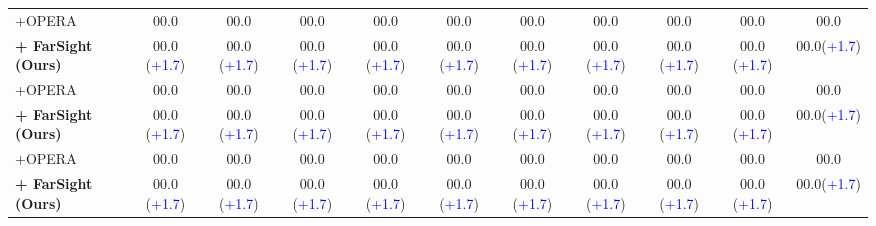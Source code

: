 {\begin{tabular}{l||ccc|cc|ccccc}
            \hdashline
            +OPERA    &00.0 &00.0 &00.0 &00.0 &00.0 &00.0 &00.0 &00.0 &00.0 &00.0\\
            \cellcolor{gray!20}\textbf{+ FarSight (Ours)}  &\cellcolor{gray!20}00.0 (\textcolor{blue}{+1.7}) &\cellcolor{gray!20}00.0 (\textcolor{blue}{+1.7})&\cellcolor{gray!20}00.0 (\textcolor{blue}{+1.7})&\cellcolor{gray!20}00.0 (\textcolor{blue}{+1.7})&\cellcolor{gray!20}00.0 (\textcolor{blue}{+1.7})&\cellcolor{gray!20}00.0 (\textcolor{blue}{+1.7})&\cellcolor{gray!20}00.0 (\textcolor{blue}{+1.7})&\cellcolor{gray!20}00.0 (\textcolor{blue}{+1.7})&\cellcolor{gray!20}00.0 (\textcolor{blue}{+1.7})&\cellcolor{gray!20}00.0(\textcolor{blue}{+1.7})\\
            \hdashline
            +OPERA    &00.0 &00.0 &00.0 &00.0 &00.0 &00.0 &00.0 &00.0 &00.0 &00.0\\
            \cellcolor{gray!20}\textbf{+ FarSight (Ours)}  &\cellcolor{gray!20}00.0 (\textcolor{blue}{+1.7}) &\cellcolor{gray!20}00.0 (\textcolor{blue}{+1.7})&\cellcolor{gray!20}00.0 (\textcolor{blue}{+1.7})&\cellcolor{gray!20}00.0 (\textcolor{blue}{+1.7})&\cellcolor{gray!20}00.0 (\textcolor{blue}{+1.7})&\cellcolor{gray!20}00.0 (\textcolor{blue}{+1.7})&\cellcolor{gray!20}00.0 (\textcolor{blue}{+1.7})&\cellcolor{gray!20}00.0 (\textcolor{blue}{+1.7})&\cellcolor{gray!20}00.0 (\textcolor{blue}{+1.7})&\cellcolor{gray!20}00.0(\textcolor{blue}{+1.7})\\
            \hdashline
            +OPERA    &00.0 &00.0 &00.0 &00.0 &00.0 &00.0 &00.0 &00.0 &00.0 &00.0\\
            \cellcolor{gray!20}\textbf{+ FarSight (Ours)}  &\cellcolor{gray!20}00.0 (\textcolor{blue}{+1.7}) &\cellcolor{gray!20}00.0 (\textcolor{blue}{+1.7})&\cellcolor{gray!20}00.0 (\textcolor{blue}{+1.7})&\cellcolor{gray!20}00.0 (\textcolor{blue}{+1.7})&\cellcolor{gray!20}00.0 (\textcolor{blue}{+1.7})&\cellcolor{gray!20}00.0 (\textcolor{blue}{+1.7})&\cellcolor{gray!20}00.0 (\textcolor{blue}{+1.7})&\cellcolor{gray!20}00.0 (\textcolor{blue}{+1.7})&\cellcolor{gray!20}00.0 (\textcolor{blue}{+1.7})&\cellcolor{gray!20}00.0(\textcolor{blue}{+1.7})\\
             \bottomrule
       \end{tabular}
   }
   


